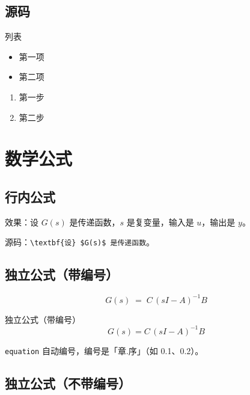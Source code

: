 \subsection{源码}

\begin{codebox}[latex]{列表}
\begin{itemize}
  \item 第一项
  \item 第二项
\end{itemize}
\begin{enumerate}
  \item 第一步
  \item 第二步
\end{enumerate}
\end{codebox}

\section{数学公式}

\subsection{行内公式}

效果：设 $G(s)$ 是传递函数，$s$ 是复变量，输入是 $u$，输出是 $y$。

源码：\texttt{\textbackslash textbf\{设\} \$G(s)\$ 是传递函数}。

\subsection{独立公式（带编号）}

\begin{equation}
  G(s) \;=\; C\,(sI - A)^{-1}B
  \label{eq:cs}
\end{equation}

\begin{codebox}[latex]{独立公式（带编号）}
\begin{equation}
  G(s) = C\,(sI - A)^{-1}B
  \label{eq:cs}
\end{equation}
\end{codebox}

\texttt{equation} 自动编号，编号是「章.序」（如 0.1、0.2）。

\subsection{独立公式（不带编号）}


